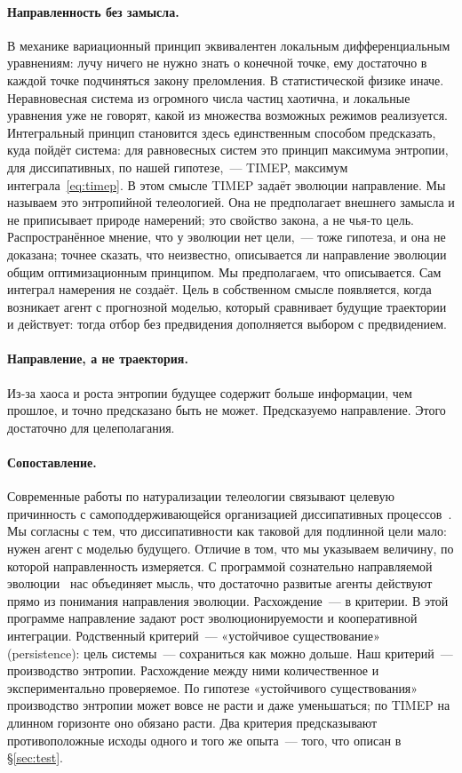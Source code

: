 \documentclass[11pt,a4paper]{article}
\newcommand{\Sref}[1]{\hyperref[#1]{\S\ref{#1}}}
\begin{document}
\paragraph{Направленность без замысла.}
В механике вариационный принцип эквивалентен локальным дифференциальным уравнениям: лучу ничего не нужно знать о конечной точке, ему достаточно в каждой точке подчиняться закону преломления. В статистической физике иначе. Неравновесная система из огромного числа частиц хаотична, и локальные уравнения уже не говорят, какой из множества возможных режимов реализуется. Интегральный принцип становится здесь единственным способом предсказать, куда пойдёт система: для равновесных систем это принцип максимума энтропии, для диссипативных, по нашей гипотезе,~--- TIMEP, максимум интеграла~\eqref{eq:timep}. В этом смысле TIMEP задаёт эволюции направление. Мы называем это энтропийной телеологией. Она не предполагает внешнего замысла и не приписывает природе намерений; это свойство закона, а не чья-то цель. Распространённое мнение, что у эволюции нет цели,~--- тоже гипотеза, и она не доказана; точнее сказать, что неизвестно, описывается ли направление эволюции общим оптимизационным принципом. Мы предполагаем, что описывается. Сам интеграл намерения не создаёт. Цель в собственном смысле появляется, когда возникает агент с прогнозной моделью, который сравнивает будущие траектории и действует: тогда отбор без предвидения дополняется выбором с предвидением.

\paragraph{Направление, а не траектория.}
Из-за хаоса и роста энтропии будущее содержит больше информации, чем прошлое, и точно предсказано быть не может. Предсказуемо направление. Этого достаточно для целеполагания.

\paragraph{Сопоставление.}
Современные работы по натурализации телеологии связывают целевую причинность с самоподдерживающейся организацией диссипативных процессов~\cite{deacon2023,valdecasas2022}. Мы согласны с тем, что диссипативности как таковой для подлинной цели мало: нужен агент с моделью будущего. Отличие в том, что мы указываем величину, по которой направленность измеряется. С программой сознательно направляемой эволюции~\cite{stewart2026} нас объединяет мысль, что достаточно развитые агенты действуют прямо из понимания направления эволюции. Расхождение~--- в критерии. В этой программе направление задают рост эволюционируемости и кооперативной интеграции. Родственный критерий~--- «устойчивое существование» (persistence): цель системы~--- сохраниться как можно дольше. Наш критерий~--- производство энтропии. Расхождение между ними количественное и экспериментально проверяемое. По гипотезе «устойчивого существования» производство энтропии может вовсе не расти и даже уменьшаться; по TIMEP на длинном горизонте оно обязано расти. Два критерия предсказывают противоположные исходы одного и того же опыта~--- того, что описан в \Sref{sec:test}.
\end{document}
